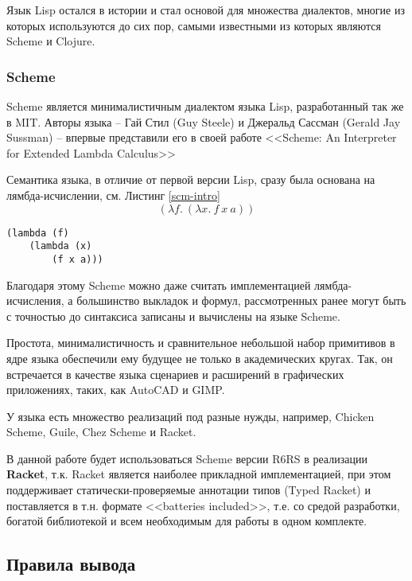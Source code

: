 \documentclass[a4paper,14pt]{extreport} %
\begin{document}
Язык Lisp остался в истории и стал основой для множества диалектов, многие из которых используются до сих пор, самыми известными из которых являются Scheme и Clojure.

\subsubsection{Scheme}

Scheme является минималистичным диалектом языка Lisp, разработанный так же в MIT. Авторы языка -- Гай Стил (Guy Steele) и Джеральд Сассман (Gerald Jay Sussman) -- впервые представили его в своей работе <<Scheme: An Interpreter for Extended Lambda Calculus>>

Семантика языка, в отличие от первой версии Lisp, сразу была основана на лямбда-исчислении, см. Листинг \ref{scm-intro}
$$(\lambda f. \ (\lambda x. \ f \ x \ a))$$

\begin{lstlisting}[caption={Лямбда-абстракция на языке Scheme}, label={scm-intro}]
(lambda (f)
    (lambda (x)
        (f x a)))
\end{lstlisting}


Благодаря этому Scheme можно даже считать имплементацией лямбда-исчисления, а большинство выкладок и формул, рассмотренных ранее могут быть с точностью до синтаксиса записаны и вычислены на языке Scheme.


Простота, минималистичность и сравнительное небольшой набор примитивов в ядре языка обеспечили ему будущее не только в академических кругах. Так, он встречается в качестве языка сценариев и расширений в графических приложениях, таких, как AutoCAD и GIMP.

У языка есть множество реализаций под разные нужды, например, Chicken Scheme, Guile, Chez Scheme и Racket.

В данной работе будет использоваться Scheme версии R6RS в реализации \textbf{Racket}, т.к. Racket является наиболее прикладной имплементацией, при этом поддерживает статически-проверяемые аннотации типов (Typed Racket) и поставляется в т.н. формате <<batteries included>>, т.е. со средой разработки, богатой библиотекой и всем необходимым для работы в одном комплекте.


\subsection{Правила вывода}

\end{document}
